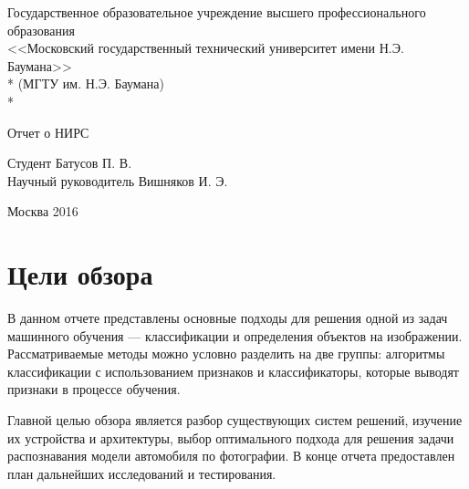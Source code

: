 \documentclass[a4paper,14pt]{extarticle} %
\begin{document}
 
\renewcommand{\figurename}{Рисунок}
\renewcommand{\baselinestretch}{1.5}
\renewcommand{\abstractname}{{Аннотация}}

\begin{titlepage}
\newpage
\begin{center}
Государственное образовательное учреждение высшего профессионального образования \\
\vspace{1cm}
\Large<<Московский государственный технический университет имени Н.Э. Баумана>> \\*
(МГТУ им. Н.Э. Баумана) \\*
\hrulefill
\end{center}
\vspace{8em}
\begin{center}
\Large  Отчет о НИРС
\end{center}
\vspace{8em}
\begin{flushleft}
Студент \hrulefill Батусов П. В. \\
\vspace{1.5em}
Научный руководитель \hrulefill Вишняков И. Э.\\
\vspace{1.5em}
\end{flushleft}
\vspace{\fill}
\begin{center}
Москва 2016
\end{center}
\end{titlepage}

\renewcommand{\contentsname}{\centering Содержание}
\tableofcontents
\newpage

\section{Цели обзора}
\hspace{\parindent} В данном отчете представлены основные подходы для решения одной из задач машинного обучения --- классификации и определения объектов на изображении. Рассматриваемые методы можно условно разделить на две группы: алгоритмы классификации с использованием признаков и классификаторы, которые выводят признаки в процессе обучения. 

Главной целью обзора является разбор существующих систем решений, изучение их устройства и архитектуры, выбор оптимального подхода для решения задачи распознавания модели автомобиля по фотографии. В конце отчета предоставлен план дальнейших исследований и тестирования.
\end{document}
